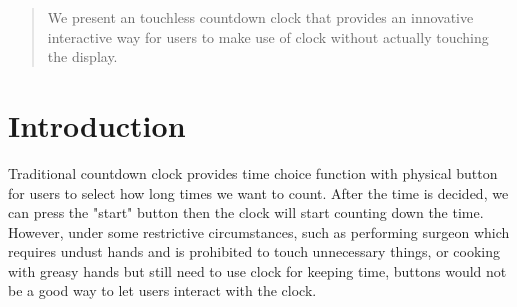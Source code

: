 \documentclass{sig-alternate-ipsn13}
\begin{document}
{%
}
\date{30 July 1999}

\maketitle
\begin{abstract}

We present an touchless countdown clock that provides an innovative interactive way for users to make use of clock without actually touching the display.
\end{abstract}

\section{Introduction}

Traditional countdown clock provides time choice function with physical button for users to select how long times we want to count. After the time is decided, we can press the "start" button then the clock will start counting down the time. However, under some restrictive circumstances, such as performing surgeon which requires undust hands and is prohibited to touch unnecessary things, or cooking with greasy hands but still need to use clock for keeping time, buttons would not be a good way to let users interact with the clock. 
\end{document}
